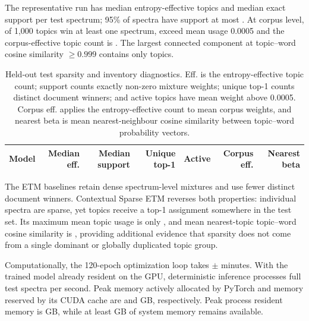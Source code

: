 \documentclass[10pt,a4paper]{article}
\begin{document}
The representative run has median \MedianEffectiveTopics{} entropy-effective
topics and median exact support \MedianExactSupport{} per test spectrum;
95\% of spectra have support at most \NinetyFifthExactSupport{}. At corpus level,
\UniqueTopOneTopics{} of 1,000 topics win at least one spectrum,
\ActiveTopics{} exceed mean usage 0.0005 and the corpus-effective topic count is
\CorpusEffectiveTopics{}. The largest connected component at topic--word cosine
similarity $\geq0.999$ contains only
\LargestStrictDuplicateComponent{} topics.

\begin{table}[H]
\centering
\footnotesize
\caption{Held-out test sparsity and inventory diagnostics. Eff. is the
entropy-effective topic count; support counts exactly non-zero mixture weights;
unique top-1 counts distinct document winners; and active topics have mean
weight above 0.0005. Corpus eff. applies the entropy-effective count to mean
corpus weights, and nearest beta is mean nearest-neighbour cosine similarity
between topic--word probability vectors.}
\label{tab:diagnostics}
\begin{tabular}{@{}lrrrrrr@{}}
\toprule
Model & Median eff. & Median support & Unique top-1 & Active & Corpus eff. & Nearest beta \\
\midrule

\end{tabular}
\end{table}

The ETM baselines retain dense spectrum-level mixtures and use fewer distinct
document winners. Contextual Sparse ETM reverses both properties: individual
spectra are sparse, yet \UniqueTopOneTopics{} topics receive a top-1 assignment
somewhere in the test set. Its maximum mean topic usage is only
\MaximumMeanTopicUsage{}, and mean nearest-topic topic--word cosine similarity
is \MeanNearestBetaCosine{}, providing additional evidence that sparsity does
not come from a single dominant or globally duplicated topic group.

Computationally, the 120-epoch optimization loop takes
\TrainingMinutesMean{} $\pm$ \TrainingMinutesSD{} minutes. With the trained model
already resident on the GPU, deterministic inference processes
\TestThroughput{} full test spectra per second. Peak memory actively
allocated by PyTorch and memory reserved by its CUDA cache are
\PeakCudaAllocatedGB{} and \PeakCudaReservedGB{} GB, respectively. Peak process
resident memory is \PeakProcessGB{} GB, while at least
\MinimumSystemAvailableGB{} GB of system memory remains available.
\end{document}
